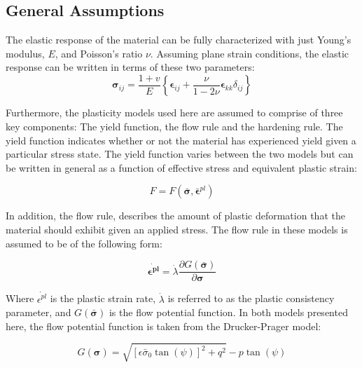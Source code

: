 \subsection{General Assumptions}
The elastic response of the material can be fully characterized with just Young's modulus, $E$, and Poisson's ratio $\nu$. Assuming plane strain conditions, the elastic response can be written in terms of these two parameters:
\begin{equation}
\boldsymbol{\sigma}_{ij}=\frac{1+v}{E}\left\{\boldsymbol{\epsilon}_{ij}+\frac{\nu}{1-2\nu}\boldsymbol{\epsilon}_{kk}\delta_{ij}\right\}
\label{eqn:const8a}
\end{equation}

Furthermore, the plasticity models used here are assumed to comprise of three key components: The yield function, the flow rule and the hardening rule. The yield function indicates whether or not the material has experienced yield given a particular stress state. The yield function varies between the two models but can be written in general as a function of effective stress and equivalent plastic strain:

\begin{equation}
    F = 
    F
    \left(
        \boldsymbol{\bar{\sigma}},\bar{\boldsymbol{\epsilon}}^{pl}
    \right)
   
\label{eqn:const8c}
\end{equation}

In addition, the flow rule, describes the amount of plastic deformation that the material should exhibit given an applied stress. The flow rule in these models is assumed to be of the following form:

\begin{equation}
\dot{\boldsymbol{\epsilon^{pl}}}=\dot{\lambda} \frac{\partial G\left(\bar{\boldsymbol{\sigma}}\right)}{\partial \boldsymbol{\sigma}}
\label{eqn:const8b}
\end{equation}

Where $\dot{\epsilon^{pl}}$ is the plastic strain rate, $\dot{\lambda}$ is referred to as the plastic consistency parameter, and $G\left(\bar{\boldsymbol{\sigma}}\right)$ is the flow potential function. In both models presented here, the flow potential function is taken from the Drucker-Prager model:

\begin{equation}
G\left(\boldsymbol{\sigma}\right)=\sqrt{\left[\epsilon\bar{\sigma}_{0}\tan\left(\psi\right)\right]^{2}+q^{2}}-p\tan\left(\psi\right)\label{eqn:const11}
\end{equation}

